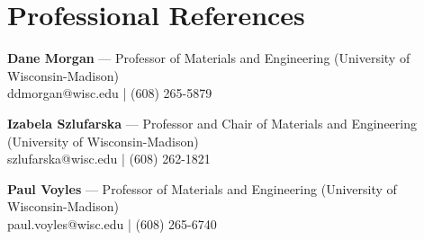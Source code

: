 \section{Professional References}

\noindent \textbf{Dane Morgan} --- Professor of Materials and Engineering (University of Wisconsin-Madison)\\
 ddmorgan@wisc.edu | (608) 265-5879

\noindent \textbf{Izabela Szlufarska} --- Professor and Chair of Materials and Engineering (University of Wisconsin-Madison)\\
 szlufarska@wisc.edu | (608) 262-1821

\noindent \textbf{Paul Voyles} --- Professor of Materials and Engineering (University of Wisconsin-Madison)\\
 paul.voyles@wisc.edu | (608) 265-6740
